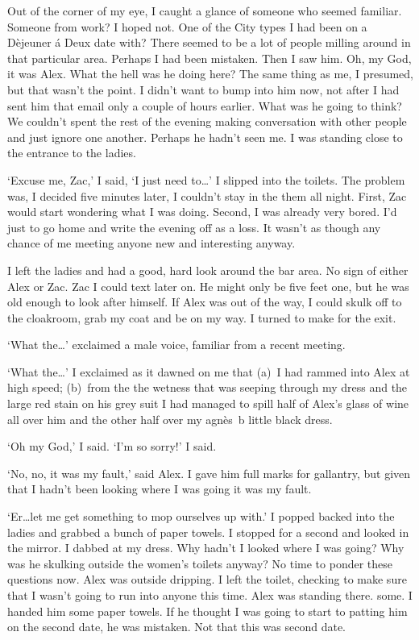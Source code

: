 Out of the corner of my eye, I caught a glance of someone who seemed
familiar. Someone from work? I hoped not. One of the City types I
had been on a D{\`e}jeuner {\'a} Deux date with? There seemed to be a
lot of people milling around in that particular area. Perhaps I had
been mistaken. Then I saw him. Oh, my God, it was Alex. What the
hell was he doing here? The same thing as me, I presumed, but that
wasn't the point. I didn't want to bump into him now, not after I
had sent him that email only a couple of hours earlier. What was he
going to think? We couldn't spent the rest of the evening making
conversation with other people and just ignore one another. Perhaps
he hadn't seen me. I was standing close to the entrance to the
ladies.

`Excuse me, Zac,' I said, `I just need to\dots' I slipped into the
toilets. The problem was, I decided five minutes later, I couldn't
stay in the them all night. First, Zac would start wondering what
I was doing. Second, I was already very bored. I'd just to go home
and write the evening off as a loss. It wasn't as though any chance
of me meeting anyone new and interesting anyway.

I left the ladies and had a good, hard look around the bar area. No
sign of either Alex or Zac. Zac I could text later on. He might only
be five feet one, but he was old enough to look after himself. If
Alex was out of the way, I could skulk off to the cloakroom, grab my
coat and be on my way. I turned to make for the exit.

`What the\dots' exclaimed a male voice, familiar from a recent meeting.

`What the\dots' I exclaimed as it dawned on me that (a)~I had rammed
into Alex at high speed; (b)~from the the wetness that was seeping
through my dress and the large red stain on his grey suit I had
managed to spill half of Alex's glass of wine all over him and the
other half over my agn{\`e}s~b little black dress.

`Oh my God,' I said. `I'm so sorry!' I said.

`No, no, it was my fault,' said Alex. I gave him full marks for
gallantry, but given that I hadn't been looking where I was going it
was my fault.

`Er\dots let me get something to mop ourselves up with.' I popped
backed into the ladies and grabbed a bunch of paper towels. I
stopped for a second and looked in the mirror. I dabbed at my dress.
Why hadn't I looked where I was going? Why was he skulking outside
the women's toilets anyway? No time to ponder these questions now.
Alex was outside dripping. I left the toilet, checking to make sure
that I wasn't going to run into anyone this time. Alex was standing
there. some. I handed him some paper towels. If he thought I was
going to start to patting him on the second date, he was mistaken.
Not that this was second date.


